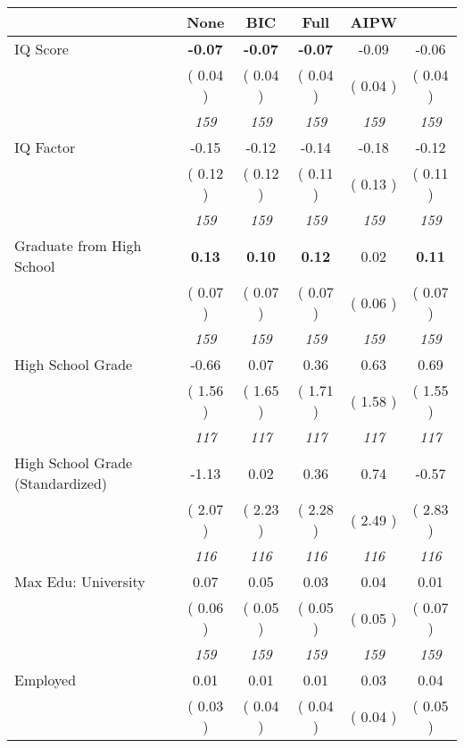 \begin{tabular}{l c c c c c}
\toprule
 & None & BIC & Full & AIPW \\
\midrule
IQ Score & \textbf{     -0.07 } & \textbf{     -0.07 } & \textbf{     -0.07 } &     -0.09 &     -0.06 \\
& (     0.04 ) & (     0.04 ) & (     0.04 ) & (     0.04 ) & (     0.04 ) \\
& \textit{ 159 } & \textit{ 159 } & \textit{ 159 } & \textit{ 159 } & \textit{ 159 } \\
IQ Factor &     -0.15 &     -0.12 &     -0.14 &     -0.18 &     -0.12 \\
& (     0.12 ) & (     0.12 ) & (     0.11 ) & (     0.13 ) & (     0.11 ) \\
& \textit{ 159 } & \textit{ 159 } & \textit{ 159 } & \textit{ 159 } & \textit{ 159 } \\
Graduate from High School & \textbf{      0.13 } & \textbf{      0.10 } & \textbf{      0.12 } &      0.02 & \textbf{     0.11} \\
& (     0.07 ) & (     0.07 ) & (     0.07 ) & (     0.06 ) & (     0.07 ) \\
& \textit{ 159 } & \textit{ 159 } & \textit{ 159 } & \textit{ 159 } & \textit{ 159 } \\
High School Grade &     -0.66 &      0.07 &      0.36 &      0.63 &      0.69 \\
& (     1.56 ) & (     1.65 ) & (     1.71 ) & (     1.58 ) & (     1.55 ) \\
& \textit{ 117 } & \textit{ 117 } & \textit{ 117 } & \textit{ 117 } & \textit{ 117 } \\
High School Grade (Standardized) &     -1.13 &      0.02 &      0.36 &      0.74 &     -0.57 \\
& (     2.07 ) & (     2.23 ) & (     2.28 ) & (     2.49 ) & (     2.83 ) \\
& \textit{ 116 } & \textit{ 116 } & \textit{ 116 } & \textit{ 116 } & \textit{ 116 } \\
Max Edu: University &      0.07 &      0.05 &      0.03 &      0.04 &      0.01 \\
& (     0.06 ) & (     0.05 ) & (     0.05 ) & (     0.05 ) & (     0.07 ) \\
& \textit{ 159 } & \textit{ 159 } & \textit{ 159 } & \textit{ 159 } & \textit{ 159 } \\
Employed &      0.01 &      0.01 &      0.01 &      0.03 &      0.04 \\
& (     0.03 ) & (     0.04 ) & (     0.04 ) & (     0.04 ) & (     0.05 ) \\

\end{tabular}
